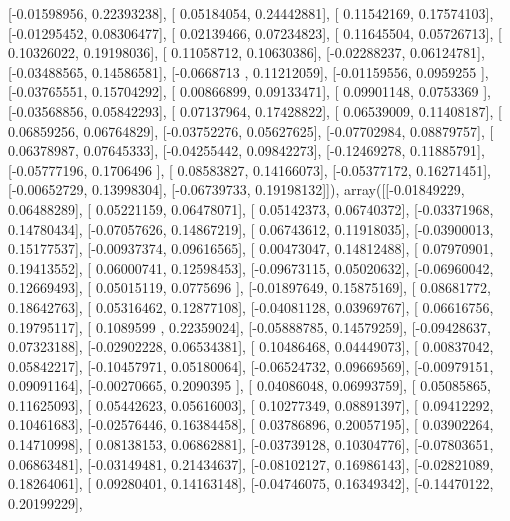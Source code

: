 \documentclass{article}
\begin{document}
       [-0.01598956,  0.22393238],
       [ 0.05184054,  0.24442881],
       [ 0.11542169,  0.17574103],
       [-0.01295452,  0.08306477],
       [ 0.02139466,  0.07234823],
       [ 0.11645504,  0.05726713],
       [ 0.10326022,  0.19198036],
       [ 0.11058712,  0.10630386],
       [-0.02288237,  0.06124781],
       [-0.03488565,  0.14586581],
       [-0.0668713 ,  0.11212059],
       [-0.01159556,  0.0959255 ],
       [-0.03765551,  0.15704292],
       [ 0.00866899,  0.09133471],
       [ 0.09901148,  0.0753369 ],
       [-0.03568856,  0.05842293],
       [ 0.07137964,  0.17428822],
       [ 0.06539009,  0.11408187],
       [ 0.06859256,  0.06764829],
       [-0.03752276,  0.05627625],
       [-0.07702984,  0.08879757],
       [ 0.06378987,  0.07645333],
       [-0.04255442,  0.09842273],
       [-0.12469278,  0.11885791],
       [-0.05777196,  0.1706496 ],
       [ 0.08583827,  0.14166073],
       [-0.05377172,  0.16271451],
       [-0.00652729,  0.13998304],
       [-0.06739733,  0.19198132]]), array([[-0.01849229,  0.06488289],
       [ 0.05221159,  0.06478071],
       [ 0.05142373,  0.06740372],
       [-0.03371968,  0.14780434],
       [-0.07057626,  0.14867219],
       [ 0.06743612,  0.11918035],
       [-0.03900013,  0.15177537],
       [-0.00937374,  0.09616565],
       [ 0.00473047,  0.14812488],
       [ 0.07970901,  0.19413552],
       [ 0.06000741,  0.12598453],
       [-0.09673115,  0.05020632],
       [-0.06960042,  0.12669493],
       [ 0.05015119,  0.0775696 ],
       [-0.01897649,  0.15875169],
       [ 0.08681772,  0.18642763],
       [ 0.05316462,  0.12877108],
       [-0.04081128,  0.03969767],
       [ 0.06616756,  0.19795117],
       [ 0.1089599 ,  0.22359024],
       [-0.05888785,  0.14579259],
       [-0.09428637,  0.07323188],
       [-0.02902228,  0.06534381],
       [ 0.10486468,  0.04449073],
       [ 0.00837042,  0.05842217],
       [-0.10457971,  0.05180064],
       [-0.06524732,  0.09669569],
       [-0.00979151,  0.09091164],
       [-0.00270665,  0.2090395 ],
       [ 0.04086048,  0.06993759],
       [ 0.05085865,  0.11625093],
       [ 0.05442623,  0.05616003],
       [ 0.10277349,  0.08891397],
       [ 0.09412292,  0.10461683],
       [-0.02576446,  0.16384458],
       [ 0.03786896,  0.20057195],
       [ 0.03902264,  0.14710998],
       [ 0.08138153,  0.06862881],
       [-0.03739128,  0.10304776],
       [-0.07803651,  0.06863481],
       [-0.03149481,  0.21434637],
       [-0.08102127,  0.16986143],
       [-0.02821089,  0.18264061],
       [ 0.09280401,  0.14163148],
       [-0.04746075,  0.16349342],
       [-0.14470122,  0.20199229],
\end{document}
